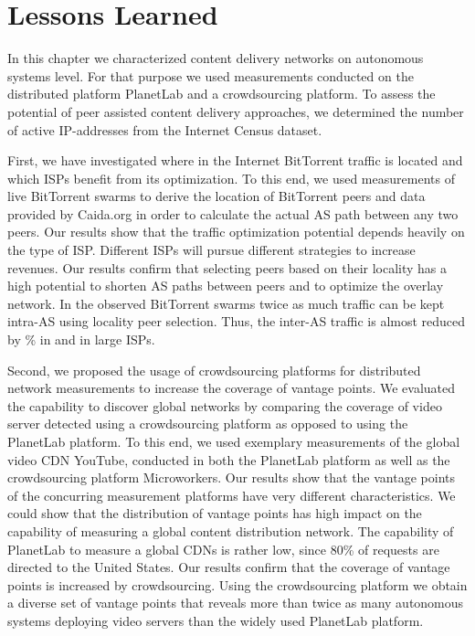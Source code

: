 \section{Lessons Learned}\label{sec:aslevel:lessons_learned}
In this chapter we characterized content delivery networks on autonomous systems level. %
For that purpose we used measurements conducted on the distributed platform PlanetLab and a crowdsourcing platform.
To assess the potential of peer assisted content delivery approaches, we determined the number of active IP-addresses from the Internet Census dataset.

First, we have investigated where in the Internet BitTorrent traffic is located and which ISPs benefit from its optimization. To this end, we used measurements of live BitTorrent swarms to derive the location of BitTorrent peers and data provided by Caida.org in order to calculate the actual AS path between any two peers.
Our results show that the traffic optimization potential depends heavily on the type of ISP. Different ISPs will pursue different strategies to increase revenues.
Our results confirm that selecting peers based on their locality has a high potential to shorten AS paths between peers and to optimize the overlay network. In the observed BitTorrent swarms twice as much traffic can be kept intra-AS using locality peer selection. Thus, the inter-AS traffic is almost reduced by \unit[50]{\%} in \tier and in large ISPs.

Second, we proposed the usage of crowdsourcing platforms for distributed network measurements to increase the coverage of vantage points.
We evaluated the capability to discover global networks by comparing the coverage of video server detected using a crowdsourcing platform as opposed to using the PlanetLab platform.
To this end, we used exemplary measurements of the global video CDN YouTube, conducted in both the PlanetLab platform as well as the crowdsourcing platform Microworkers.
Our results show that the vantage points of the concurring measurement platforms have very different characteristics.
We could show that the distribution of vantage points has high impact on the capability of measuring a global content distribution network.
The capability of PlanetLab to measure a global CDNs is rather low, since 80\% of requests are directed to the United States.
Our results confirm that the coverage of vantage points is increased by crowdsourcing.
Using the crowdsourcing platform we obtain a diverse set of vantage points that reveals more than twice as many autonomous systems deploying video servers than the widely used PlanetLab platform.

